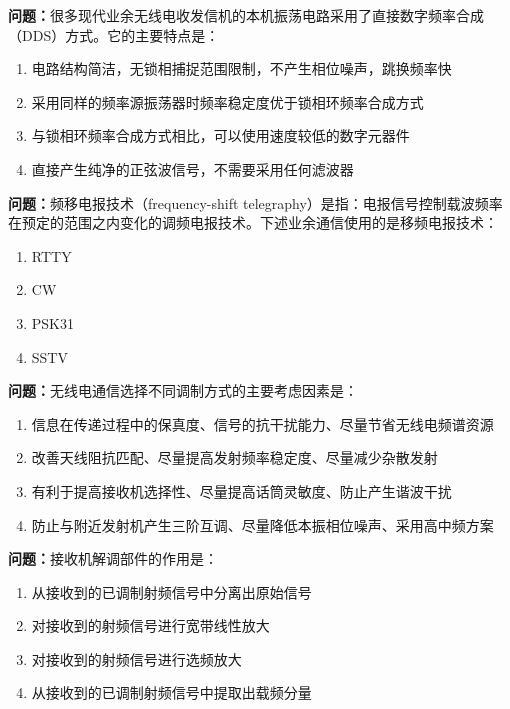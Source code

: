 \bigskip


\noindent\textbf{问题：}很多现代业余无线电收发信机的本机振荡电路采用了直接数字频率合成（DDS）方式。它的主要特点是：
\begin{enumerate}[label=\Alph*), leftmargin=3em]
\item 电路结构简洁，无锁相捕捉范围限制，不产生相位噪声，跳换频率快
\item 采用同样的频率源振荡器时频率稳定度优于锁相环频率合成方式
\item 与锁相环频率合成方式相比，可以使用速度较低的数字元器件
\item 直接产生纯净的正弦波信号，不需要采用任何滤波器
\end{enumerate}

\bigskip


\noindent\textbf{问题：}频移电报技术（frequency-shift telegraphy）是指：电报信号控制载波频率在预定的范围之内变化的调频电报技术。下述业余通信使用的是移频电报技术：
\begin{enumerate}[label=\Alph*), leftmargin=3em]
\item RTTY
\item CW
\item PSK31
\item SSTV
\end{enumerate}

\bigskip


\noindent\textbf{问题：}无线电通信选择不同调制方式的主要考虑因素是：
\begin{enumerate}[label=\Alph*), leftmargin=3em]
\item 信息在传递过程中的保真度、信号的抗干扰能力、尽量节省无线电频谱资源
\item 改善天线阻抗匹配、尽量提高发射频率稳定度、尽量减少杂散发射
\item 有利于提高接收机选择性、尽量提高话筒灵敏度、防止产生谐波干扰
\item 防止与附近发射机产生三阶互调、尽量降低本振相位噪声、采用高中频方案
\end{enumerate}

\bigskip


\noindent\textbf{问题：}接收机解调部件的作用是：
\begin{enumerate}[label=\Alph*), leftmargin=3em]
\item 从接收到的已调制射频信号中分离出原始信号
\item 对接收到的射频信号进行宽带线性放大
\item 对接收到的射频信号进行选频放大
\item 从接收到的已调制射频信号中提取出载频分量
\end{enumerate}

